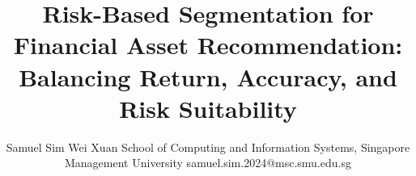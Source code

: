 \title{Risk-Based Segmentation for Financial Asset Recommendation: Balancing Return, Accuracy, and Risk Suitability}

\author{
    Samuel Sim Wei Xuan
    \affiliations
    School of Computing and Information Systems, Singapore Management University
    \emails
    samuel.sim.2024@msc.smu.edu.sg
}
